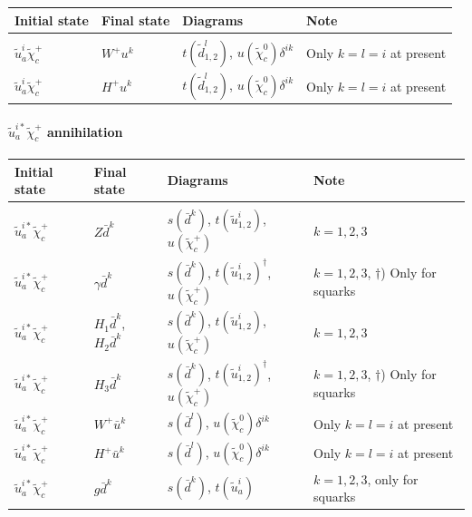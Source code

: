 \documentclass[a4paper,10pt,oneside]{book}
\newcommand{\tabspace}{\\[-2.5ex]}
\begin{document}
\begin{center}
\begin{tabular}{llll} \hline
{\bfseries Initial state} & {\bfseries Final state} &
{\bfseries Diagrams} & {\bfseries Note} \\ \hline \tabspace
$\tilde{u}^i_a \tilde{\chi}_{c}^+$ & $W^+ u^k$ &
$t(\tilde{d}^l_{1,2})$, $u(\tilde{\chi}_c^0)\delta^{ik}$ &
Only $k=l=i$ at present \\
$\tilde{u}^i_a \tilde{\chi}_{c}^+$ & $H^+ u^k$ &
$t(\tilde{d}^l_{1,2})$, $u(\tilde{\chi}_c^0)\delta^{ik}$ 
& Only $k=l=i$ at present \\ \hline
\end{tabular}
\end{center}

\paragraph{$\tilde{u}^{i*}_{a} \tilde{\chi}_{c}^{+}$ annihilation}

\begin{center}
\begin{tabular}{llll} \hline
{\bfseries Initial state} & {\bfseries Final state} &
{\bfseries Diagrams} & {\bfseries Note} \\ \hline \tabspace
$\tilde{u}^{i*}_a \tilde{\chi}_{c}^+$ & $Z \bar{d}^k$ &
$s(\bar{d}^k)$, $t(\tilde{u}^i_{1,2})$, $u(\tilde{\chi}_c^+)$ 
& $k=1,2,3$ \\
$\tilde{u}^{i*}_a \tilde{\chi}_{c}^+$ & $\gamma \bar{d}^k$ &
$s(\bar{d}^k)$, $t(\tilde{u}^i_{1,2})^\dagger$, $u(\tilde{\chi}_c^+)$ 
& $k=1,2,3$, $\dagger$) Only for squarks \\
$\tilde{u}^{i*}_a \tilde{\chi}_{c}^+$ & $H_1 \bar{d}^k$, $H_2 \bar{d}^k$ &
$s(\bar{d}^k)$, $t(\tilde{u}^i_{1,2})$, $u(\tilde{\chi}_c^+)$
& $k=1,2,3$ \\
$\tilde{u}^{i*}_a \tilde{\chi}_{c}^+$ & $H_3 \bar{d}^k$ &
$s(\bar{d}^k)$, $t(\tilde{u}^i_{1,2})^\dagger$, $u(\tilde{\chi}_c^+)$ 
& $k=1,2,3$, $\dagger$) Only for squarks\\
$\tilde{u}^{i*}_a \tilde{\chi}_{c}^+$ & $W^+ \bar{u}^k$ &
$s(\bar{d}^l)$, $u(\tilde{\chi}_c^0)\delta^{ik}$ 
& Only $k=l=i$ at present \\
$\tilde{u}^{i*}_a \tilde{\chi}_{c}^+$ & $H^+ \bar{u}^k$ &
$s(\bar{d}^l)$, $u(\tilde{\chi}_c^0)\delta^{ik}$ 
& Only $k=l=i$ at present \\
$\tilde{u}^{i*}_a \tilde{\chi}_{c}^+$ & $g \bar{d}^k$ &
$s(\bar{d}^k)$, $t(\tilde{u}_a^i)$ 
& $k=1,2,3$, only for squarks \\ \hline
\end{tabular}
\end{center}
\end{document}
